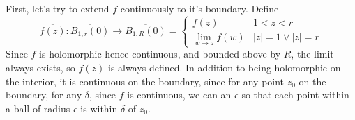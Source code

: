 \documentclass{homework}
\begin{document}
                                                                                                                                                                            \begin{solution}
                                                                                                                                                                            First, let's try to extend $f$ continuously to it's boundary. Define
                                                                                                                                                                            \[
                                                                                                                                                                            \overline{f(z)}:\overline{B_{1,r}(0)}\to \overline{B_{1,R}(0)} = \begin{cases}
                                                                                                                                                                            f(z) & 1 < z < r \\ 
                                                                                                                                                                            \lim_{w\to z} f(w) & |z| = 1 \lor |z| = r
                                                                                                                                                                            \end{cases}
                                                                                                                                                                            \]
                                                                                                                                                                            Since $f$ is holomorphic hence continuous, and bounded above by $R$, the limit always exists, so $\overline{f(z)}$ is always defined. In addition to being holomorphic on the interior, it is continuous on the boundary, since for any point $z_0$ on the boundary, for any $\delta$, since $f$ is continuous, we can an $\epsilon$ so that each point within a ball of radius $\epsilon$ is within $\delta$ of $z_0.$


\end{solution}
\end{document}
